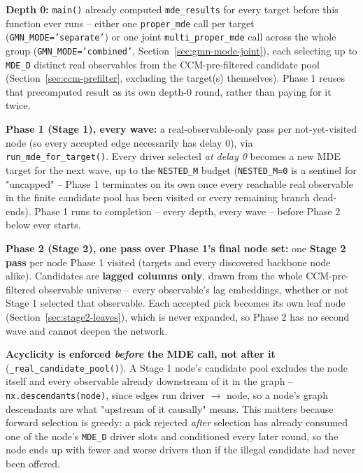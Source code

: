 \documentclass[11pt]{article}
\begin{document}
\begin{steps}
\item \textbf{Depth 0:} \texttt{main()} already computed \texttt{mde\_results} for every target before this function ever runs -- either one \texttt{proper\_mde} call per target (\texttt{GMN\_MODE='separate'}) or one joint \texttt{multi\_proper\_mde} call across the whole group (\texttt{GMN\_MODE='combined'}, Section~\ref{sec:gmn-mode-joint}), each selecting up to \texttt{MDE\_D} distinct real observables from the CCM-pre-filtered candidate pool (Section~\ref{sec:ccm-prefilter}, excluding the target(s) themselves). Phase 1 reuses that precomputed result as its own depth-0 round, rather than paying for it twice.
\item \textbf{Phase 1 (Stage 1), every wave:} a real-observable-only pass per not-yet-visited node (so every accepted edge necessarily has delay 0), via \texttt{run\_mde\_for\_target()}. Every driver selected \emph{at delay 0} becomes a new MDE target for the next wave, up to the \texttt{NESTED\_M} budget (\texttt{NESTED\_M=0} is a sentinel for "uncapped" -- Phase 1 terminates on its own once every reachable real observable in the finite candidate pool has been visited or every remaining branch dead-ends). Phase 1 runs to completion -- every depth, every wave -- before Phase 2 below ever starts.
\item \textbf{Phase 2 (Stage 2), one pass over Phase 1's final node set:} one \textbf{Stage 2 pass} per node Phase 1 visited (targets and every discovered backbone node alike). Candidates are \textbf{lagged columns only}, drawn from the whole CCM-pre-filtered observable universe -- every observable's lag embeddings, whether or not Stage 1 selected that observable. Each accepted pick becomes its own leaf node (Section~\ref{sec:stage2-leaves}), which is never expanded, so Phase 2 has no second wave and cannot deepen the network.
\item \textbf{Acyclicity is enforced \emph{before} the MDE call, not after it} (\texttt{\_real\_candidate\_pool()}). A Stage 1 node's candidate pool excludes the node itself and every observable already downstream of it in the graph -- \texttt{nx.descendants(node)}, since edges run driver $\to$ node, so a node's graph descendants are what "upstream of it causally" means. This matters because forward selection is greedy: a pick rejected \emph{after} selection has already consumed one of the node's \texttt{MDE\_D} driver slots and conditioned every later round, so the node ends up with fewer and worse drivers than if the illegal candidate had never been offered.

\end{steps}
\end{document}
